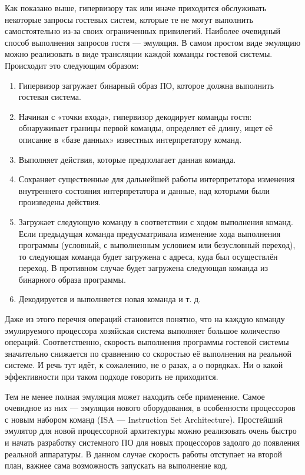 \documentclass[14pt, a4paper]{article}
\begin{document}
Как показано выше, гипервизору так или иначе приходится обслуживать некоторые запросы гостевых
систем, которые те не могут выполнить самостоятельно из-за своих ограниченных привилегий.
Наиболее очевидный способ выполнения запросов гостя — эмуляция. В самом простом виде
эмуляцию можно реализовать в виде трансляции каждой команды гостевой системы.\\

Происходит это следующим образом:

\begin{enumerate}
    \item Гипервизор загружает бинарный образ ПО, которое должна выполнить гостевая система.
    \item Начиная с «точки входа», гипервизор декодирует команды гостя: обнаруживает границы
    первой команды, определяет её длину, ищет её описание в «базе данных» известных
    интерпретатору команд.
    \item Выполняет действия, которые предполагает данная команда.
    \item Сохраняет существенные для дальнейшей работы интерпретатора изменения внутреннего
    состояния интерпретатора и данные, над которыми были произведены действия.
    \item Загружает следующую команду в соответствии с ходом выполнения команд. Если предыдущая
    команда предусматривала изменение хода выполнения программы (условный, с
    выполненным условием или безусловный переход), то следующая команда будет загружена с
    адреса, куда был осуществлён переход. В противном случае будет загружена следующая
    команда из бинарного образа программы.
    \item Декодируется и выполняется новая команда и т. д.
\end{enumerate}

Даже из этого перечня операций становится понятно, что на каждую команду эмулируемого
процессора хозяйская система выполняет большое количество операций. Соответственно, скорость
выполнения программы гостевой системы значительно снижается по сравнению со скоростью её
выполнения на реальной системе. И речь тут идёт, к сожалению, не о разах, а о порядках. Ни о какой
эффективности при таком подходе говорить не приходится.

Тем не менее полная эмуляция может находить себе применение. Самое очевидное из них —
эмуляция нового оборудования, в особенности процессоров с новым набором команд (ISA —
Instruction Set Architecture). Простейший эмулятор для новой процессорной архитектуры можно
реализовать очень быстро и начать разработку системного ПО для новых процессоров задолго до
появления реальной аппаратуры. В данном случае скорость работы отступает на второй план, важнее
сама возможность запускать на выполнение код.
\end{document}
